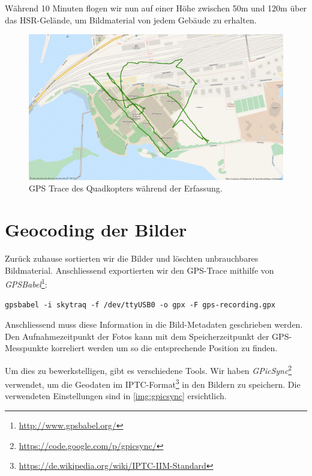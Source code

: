 \noindent Während 10 Minuten flogen wir nun auf einer Höhe zwischen 50m und 120m
über das HSR-Gelände, um Bildmaterial von jedem Gebäude zu erhalten.
\begin{figure}[H]
	\centering
	\includegraphics[width=\textwidth]{images/gpstrace_hsr_mapquest}
	\caption{GPS Trace des Quadkopters während der Erfassung.}
	\label{img:gpstrace_hsr_mapquest}
\end{figure}


\section{Geocoding der Bilder}

\label{workflow:hsr:geocoding}

Zurück zuhause sortierten wir die Bilder und löschten unbrauchbares
Bildmaterial. Anschliessend exportierten wir den GPS-Trace mithilfe von
\textit{GPSBabel}\footnote{\url{http://www.gpsbabel.org/}}:

\vspace{0.5\baselineskip}
\begin{verbatim} 
gpsbabel -i skytraq -f /dev/ttyUSB0 -o gpx -F gps-recording.gpx
\end{verbatim}

Anschliessend muss diese Information in die Bild-Metadaten geschrieben werden.
Den Aufnahmezeitpunkt der Fotos kann mit dem Speicherzeitpunkt der
GPS-Messpunkte korreliert werden um so die entsprechende Position zu finden.

Um dies zu bewerkstelligen, gibt es verschiedene Tools. Wir haben
\textit{GPicSync}\footnote{\url{https://code.google.com/p/gpicsync/}} verwendet,
um die Geodaten im
IPTC-Format\footnote{\url{https://de.wikipedia.org/wiki/IPTC-IIM-Standard}} in
den Bildern zu speichern. Die verwendeten Einstellungen sind in
\autoref{img:gpicsync} ersichtlich.

